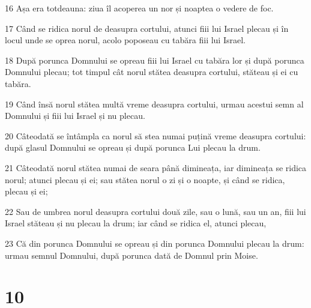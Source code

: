 \par 16 Așa era totdeauna: ziua îl acoperea un nor și noaptea o vedere de foc.
\par 17 Când se ridica norul de deasupra cortului, atunci fiii lui Israel plecau și în locul unde se oprea norul, acolo poposeau cu tabăra fiii lui Israel.
\par 18 După porunca Domnului se opreau fiii lui Israel cu tabăra lor și după porunca Domnului plecau; tot timpul cât norul stătea deasupra cortului, stăteau și ei cu tabăra.
\par 19 Când însă norul stătea multă vreme deasupra cortului, urmau acestui semn al Domnului și fiii lui Israel și nu plecau.
\par 20 Câteodată se întâmpla ca norul să stea numai puțină vreme deasupra cortului: după glasul Domnului se opreau și după porunca Lui plecau la drum.
\par 21 Câteodată norul stătea numai de seara până dimineața, iar dimineața se ridica norul; atunci plecau și ei; sau stătea norul o zi și o noapte, și când se ridica, plecau și ei;
\par 22 Sau de umbrea norul deasupra cortului două zile, sau o lună, sau un an, fiii lui Israel stăteau și nu plecau la drum; iar când se ridica el, atunci plecau,
\par 23 Că din porunca Domnului se opreau și din porunca Domnului plecau la drum: urmau semnul Domnului, după porunca dată de Domnul prin Moise.

\chapter{10}

